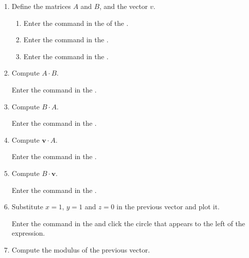 \begin{enumerate}
      \begin{enumerate}
      \item Define the matrices $A$ and $B$, and the vector $v$.
            \begin{indication}
            \begin{enumerate}
            \item Enter the command  in the  of the .
            \item Enter the command  in the .
            \item Enter the command  in the .
            \end{enumerate}
            \end{indication}
      \item Compute $A\cdot B$.
            \begin{indication}
            Enter the command  in the .
            \end{indication}
      \item Compute $B\cdot A$.
            \begin{indication}
            Enter the command  in the .
            \end{indication}
      \item Compute $\mathbf{v}\cdot A$.
            \begin{indication}
            Enter the command  in the .
            \end{indication}
      \item Compute $B\cdot \mathbf{v}$.
            \begin{indication}
            Enter the command  in the .
            \end{indication}
      \item Substitute $x=1$, $y=1$ and $z=0$ in the previous vector and plot it.
            \begin{indication}
            Enter the command  in the  and click the circle that appears to the left of the expression.
            \end{indication}
      \item Compute the modulus of the previous vector.
            \begin{indication}

\end{indication}
\end{enumerate}
\end{enumerate}

